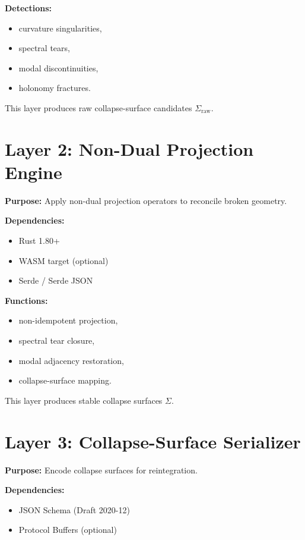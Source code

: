 \documentclass[11pt]{article}
\begin{document}
\textbf{Detections:}
\begin{itemize}
  \item curvature singularities,
  \item spectral tears,
  \item modal discontinuities,
  \item holonomy fractures.
\end{itemize}

This layer produces raw collapse-surface candidates $\Sigma_{\mathrm{raw}}$.

\section{Layer 2: Non-Dual Projection Engine}

\textbf{Purpose:} Apply non-dual projection operators to reconcile broken geometry.

\textbf{Dependencies:}
\begin{itemize}
  \item Rust 1.80+
  \item WASM target (optional)
  \item Serde / Serde JSON
\end{itemize}

\textbf{Functions:}
\begin{itemize}
  \item non-idempotent projection,
  \item spectral tear closure,
  \item modal adjacency restoration,
  \item collapse-surface mapping.
\end{itemize}

This layer produces stable collapse surfaces $\Sigma$.

\section{Layer 3: Collapse-Surface Serializer}

\textbf{Purpose:} Encode collapse surfaces for reintegration.

\textbf{Dependencies:}
\begin{itemize}
  \item JSON Schema (Draft 2020-12)
  \item Protocol Buffers (optional)
\end{itemize}
\end{document}

